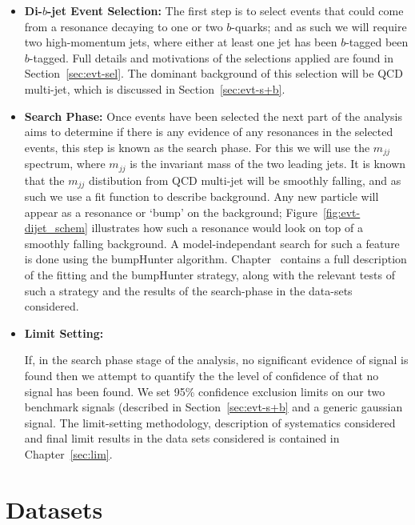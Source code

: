 \begin{itemize}[leftmargin=*]
\item\textbf{Di-$b$-jet Event Selection:}
  The first step is to select events that could come from a resonance decaying to one or two $b$-quarks;
  and as such we will require two high-momentum jets, where either at least one jet has been $b$-tagged been $b$-tagged.
  Full details and motivations of the selections applied are found in Section~\ref{sec:evt-sel}.
  The dominant background of this selection will be QCD multi-jet, which is discussed in Section~\ref{sec:evt-s+b}.
  \vspace{0.5em}
\item\textbf{Search Phase:}
  Once events have been selected the next part of the analysis aims to determine if there is
  any evidence of any resonances in the selected events, this step is known as the search phase.
  For this we will use the $m_{jj}$ spectrum, where $m_{jj}$ is the invariant mass of the two leading jets.
  It is known that the $m_{jj}$ distibution from QCD multi-jet will be smoothly falling,
  and as such we use a fit function to describe background.
  Any new particle will appear as a resonance or `bump' on the background; 
  Figure~\ref{fig:evt-dijet_schem} illustrates how such a resonance would look on top of a smoothly falling background.
  A model-independant search for such a feature is done using the bumpHunter algorithm.
  Chapter~\label{sec:bkg} contains a full description of the fitting and the bumpHunter strategy,
  along with the relevant tests of such a strategy and the results of the search-phase in the data-sets considered.  
  \vspace{0.5em}
\item\textbf{Limit Setting:}

  If, in the search phase stage of the analysis, no significant evidence of signal is
  found then we attempt to quantify the the level of confidence of that no signal has been found.
  We set 95\% confidence exclusion limits on our two benchmark signals (described in Section~\ref{sec:evt-s+b}
  and a generic gaussian signal.
  The limit-setting methodology, description of systematics considered
  and final limit results in the data sets considered is contained in Chapter~\ref{sec:lim}.


\end{itemize}







\section{Datasets}
\label{sec:evt-datasets}

